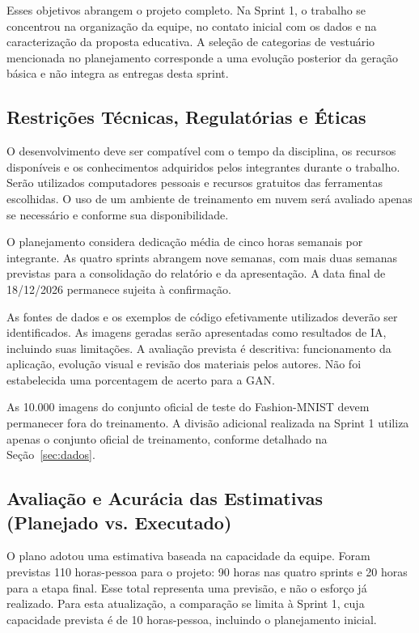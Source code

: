 \documentclass[12pt,a4paper]{article}
\begin{document}
Esses objetivos abrangem o projeto completo. Na Sprint 1, o trabalho se concentrou na organização da equipe, no contato inicial com os dados e na caracterização da proposta educativa. A seleção de categorias de vestuário mencionada no planejamento corresponde a uma evolução posterior da geração básica e não integra as entregas desta sprint.

\subsection{Restrições Técnicas, Regulatórias e Éticas}
O desenvolvimento deve ser compatível com o tempo da disciplina, os recursos disponíveis e os conhecimentos adquiridos pelos integrantes durante o trabalho. Serão utilizados computadores pessoais e recursos gratuitos das ferramentas escolhidas. O uso de um ambiente de treinamento em nuvem será avaliado apenas se necessário e conforme sua disponibilidade.

O planejamento considera dedicação média de cinco horas semanais por integrante. As quatro sprints abrangem nove semanas, com mais duas semanas previstas para a consolidação do relatório e da apresentação. A data final de 18/12/2026 permanece sujeita à confirmação.

As fontes de dados e os exemplos de código efetivamente utilizados deverão ser identificados. As imagens geradas serão apresentadas como resultados de IA, incluindo suas limitações. A avaliação prevista é descritiva: funcionamento da aplicação, evolução visual e revisão dos materiais pelos autores. Não foi estabelecida uma porcentagem de acerto para a GAN.

As 10.000 imagens do conjunto oficial de teste do Fashion-MNIST devem permanecer fora do treinamento. A divisão adicional realizada na Sprint 1 utiliza apenas o conjunto oficial de treinamento, conforme detalhado na Seção~\ref{sec:dados}.

\subsection{Avaliação e Acurácia das Estimativas (Planejado vs. Executado)}
O plano adotou uma estimativa baseada na capacidade da equipe. Foram previstas 110 horas-pessoa para o projeto: 90 horas nas quatro sprints e 20 horas para a etapa final. Esse total representa uma previsão, e não o esforço já realizado. Para esta atualização, a comparação se limita à Sprint 1, cuja capacidade prevista é de 10 horas-pessoa, incluindo o planejamento inicial.
\end{document}
